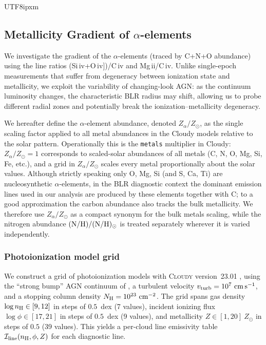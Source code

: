 \documentclass[linenumbers,trackchanges]{aastex701}
\begin{document}
\begin{CJK*}{UTF8}{ipxm}

\subsection{Metallicity Gradient of $\alpha$-elements}

We investigate the gradient of the $\alpha$-elements (traced by C+N+O abundance) using
the line ratios (Si\,{\sc iv}+O\,{\sc iv}])/C\,{\sc iv} and Mg\,{\sc ii}/C\,{\sc iv}.
Unlike single-epoch measurements that suffer from degeneracy between ionization state
and metallicity, we exploit the variability of changing-look AGN: as the continuum
luminosity changes, the characteristic BLR radius may shift, allowing us to probe
different radial zones and potentially break the ionization--metallicity degeneracy.

We hereafter define the $\alpha$-element abundance, denoted $Z_{\alpha}/Z_{\odot}$,
as the single scaling factor applied to all metal abundances in the Cloudy models
relative to the solar pattern.  Operationally this is the \texttt{metals} multiplier
in Cloudy: $Z_{\alpha}/Z_{\odot} = 1$ corresponds to scaled-solar abundances of all
metals (C, N, O, Mg, Si, Fe, etc.), and a grid in $Z_{\alpha}/Z_{\odot}$ scales every
metal proportionally about the solar values.  Although strictly speaking only O, Mg,
Si (and S, Ca, Ti) are nucleosynthetic $\alpha$-elements, in the BLR diagnostic context
the dominant emission lines used in our analysis are produced by these elements together
with C; to a good approximation the carbon abundance also tracks the bulk metallicity.
We therefore use $Z_{\alpha}/Z_{\odot}$ as a compact synonym for the bulk metals
scaling, while the nitrogen abundance $({\rm N/H})/({\rm N/H})_{\odot}$ is treated
separately wherever it is varied independently.

\subsubsection{Photoionization model grid}
\label{sec:loc_grid}

We construct a grid of photoionization models with \textsc{Cloudy} version~23.01
\citep{Ferland2017}, using the ``strong bump'' AGN continuum of \citet{Nagao2006a},
a turbulent velocity $v_{\rm turb}=10^{7}~{\rm cm\,s^{-1}}$, and a stopping column
density $N_{\rm H}=10^{23}~{\rm cm^{-2}}$.  The grid spans gas density
$\log n_{\rm H}\in[9,12]$ in steps of $0.5$~dex (7 values), incident ionizing flux
$\log\phi\in[17,21]$ in steps of $0.5$~dex (9 values), and metallicity
$Z\in[1,20]~Z_{\odot}$ in steps of $0.5$ (39 values).  This yields a per-cloud line
emissivity table $\mathcal{I}_{\rm line}(n_{\rm H},\phi,Z)$ for each diagnostic line.


\end{CJK*}
\end{document}

